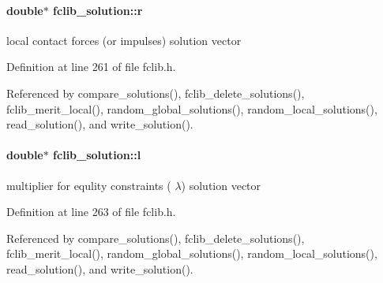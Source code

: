 \hypertarget{structfclib__solution_aba0437aebbb1060350ef2f0a6e8b504d}{
\paragraph[{r}]{\setlength{\rightskip}{0pt plus 5cm}double$\ast$ fclib\-\_\-solution\-::r}}\label{structfclib__solution_aba0437aebbb1060350ef2f0a6e8b504d}


local contact forces (or impulses) solution vector 



Definition at line 261 of file fclib.\-h.



Referenced by compare\-\_\-solutions(), fclib\-\_\-delete\-\_\-solutions(), fclib\-\_\-merit\-\_\-local(), random\-\_\-global\-\_\-solutions(), random\-\_\-local\-\_\-solutions(), read\-\_\-solution(), and write\-\_\-solution().

\hypertarget{structfclib__solution_a872a687856540dd19286aec43d890ede}{
\paragraph[{l}]{\setlength{\rightskip}{0pt plus 5cm}double$\ast$ fclib\-\_\-solution\-::l}}\label{structfclib__solution_a872a687856540dd19286aec43d890ede}


multiplier for equlity constraints ( $\lambda$) solution vector 



Definition at line 263 of file fclib.\-h.



Referenced by compare\-\_\-solutions(), fclib\-\_\-delete\-\_\-solutions(), fclib\-\_\-merit\-\_\-local(), random\-\_\-global\-\_\-solutions(), random\-\_\-local\-\_\-solutions(), read\-\_\-solution(), and write\-\_\-solution().

